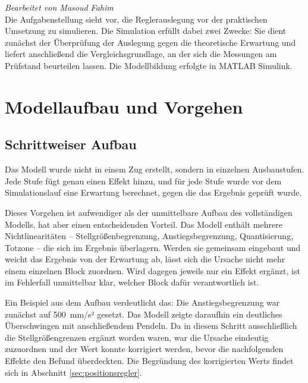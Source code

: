 
\textit{Bearbeitet von Masoud Fahim}\\

Die Aufgabenstellung sieht vor, die Reglerauslegung vor der praktischen Umsetzung zu
simulieren. Die Simulation erfüllt dabei zwei Zwecke: Sie dient zunächst der Überprüfung
der Auslegung gegen die theoretische Erwartung und liefert anschließend die
Vergleichsgrundlage, an der sich die Messungen am Prüfstand beurteilen lassen. Die
Modellbildung erfolgte in MATLAB Simulink.

\section{Modellaufbau und Vorgehen}
\label{sec:modellaufbau}

\subsection*{Schrittweiser Aufbau}

Das Modell wurde nicht in einem Zug erstellt, sondern in einzelnen Ausbaustufen. Jede
Stufe fügt genau einen Effekt hinzu, und für jede Stufe wurde vor dem Simulationslauf eine
Erwartung berechnet, gegen die das Ergebnis geprüft wurde.

Dieses Vorgehen ist aufwendiger als der unmittelbare Aufbau des vollständigen Modells,
hat aber einen entscheidenden Vorteil. Das Modell enthält mehrere Nichtlinearitäten --
Stellgrößenbegrenzung, Anstiegsbegrenzung, Quantisierung, Totzone -- die sich im Ergebnis
überlagern. Werden sie gemeinsam eingebaut und weicht das Ergebnis von der Erwartung ab,
lässt sich die Ursache nicht mehr einem einzelnen Block zuordnen. Wird dagegen jeweils nur
ein Effekt ergänzt, ist im Fehlerfall unmittelbar klar, welcher Block dafür verantwortlich
ist.

Ein Beispiel aus dem Aufbau verdeutlicht das: Die Anstiegsbegrenzung war zunächst auf
500~mm/s² gesetzt. Das Modell zeigte daraufhin ein deutliches Überschwingen mit
anschließendem Pendeln. Da in diesem Schritt ausschließlich die Stellgrößengrenzen
ergänzt worden waren, war die Ursache eindeutig zuzuordnen und der Wert konnte korrigiert
werden, bevor die nachfolgenden Effekte den Befund überdeckten. Die Begründung des
korrigierten Werts findet sich in Abschnitt \ref{sec:positionsregler}.

